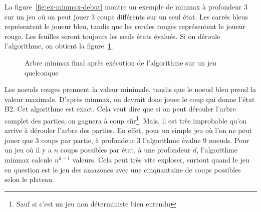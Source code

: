 La figure~\ref{fig:ex-minmax-debut} montre un exemple de minmax à profondeur 3 sur un jeu où on peut jouer 3 coups différents sur un seul état.
Les carrés bleus représentent le joueur bleu, tandis que les cercles rouges représentent le joueur rouge.
Les feuilles seront toujours les seuls états évalués. Si on déroule l'algorithme, on obtient la figure~\ref{fig:ex-minmax-fin}.

\begin{figure}[H]
	\centering
	\caption{Arbre minmax final après exécution de l'algorithme sur un jeu quelconque}
	\label{fig:ex-minmax-fin}
\end{figure}
Les noeuds rouges prennent la valeur minimale, tandis que le noeud bleu prend la valeur maximale.
D'après minmax, on devrait donc jouer le coup qui donne l'état B2. Cet algorithme
est exact. Cela veut dire que si on peut dérouler l'arbre complet des parties, on gagnera à coup sûr\footnote{Sauf si c'est un jeu non déterministe bien entendu}.
Mais, il est très improbable qu'on arrive à dérouler l'arbre des parties. En effet, pour un simple jeu où l'on ne
peut jouer que 3 coups par partie, à profondeur 3 l'algorithme évalue 9 noeuds. Pour un jeu où il y a $n$ coups possibles
par état, à une profondeur $d$, l'algorithme minmax calcule $n^{d-1}$ valeurs. Cela peut très vite exploser,
surtout quand le jeu en question est le jeu des amazones avec une cinquantaine de coups possibles selon le plateau.

